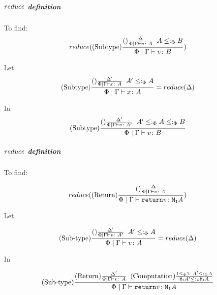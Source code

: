 {            
            \subparagraph{$reduce$ definition}
            To find:
            \begin{equation}
                reduce((\text{Subtype}) \frac{(\text{}) \frac{\Delta}{\Phi\mid\Gamma \vdash v \colon A}\;\; A \leq:_\Phi B}{\Phi\mid\Gamma \vdash v \colon B})
            \end{equation}

            Let 
            \begin{equation}\label{SubtypeDeltaReduction}
                (\text{Subtype}) \frac{(\text{}) \frac{\Delta'}{\Phi\mid\Gamma \vdash x \colon A}\;\; A'\leq:_\Phi A}{\Phi\mid\Gamma \vdash x \colon A} = reduce(\Delta)
            \end{equation}

            In 
            \begin{equation}
                (\text{Subtype}) \frac{
                    (\text{}) \frac{\Delta'}{\Phi\mid\Gamma \vdash v \colon A'}
                \;\;
                A' \leq:_\Phi A \leq:_\Phi B
                }{\Phi\mid\Gamma \vdash v \colon B}
            \end{equation}


            \subparagraph{$reduce$ definition}
            To find:
            
                \begin{equation}
                    reduce((\text{Return}) \frac{
                        (\text{}) \frac{\Delta}{\Phi\mid\Gamma \vdash v \colon A}
                    }{\Phi\mid\Gamma \vdash \texttt{return} v \colon \texttt{M}_{\texttt{1}}{A}})
                \end{equation}

                Let 

                \begin{equation}
                    (\text{Sub-type}) \frac{
                        (\text{}) \frac{\Delta'}{\Phi\mid\Gamma \vdash v \colon A'}
                        \;\;
                        A' \leq:_\Phi A
                    }{
                        \Phi\mid\Gamma \vdash v \colon A
                    } = reduce(\Delta)
                \end{equation}

                In

                \begin{equation}
                    (\text{Sub-type}) \frac{
                        (\text{Return}) \frac{
                            \Delta'
                        }{
                            \Phi\mid\Gamma \vdash v \colon A
                        }
                        \;\;
                        (\text{Computation}) \frac{         \texttt{1}\leq_{\Phi}\texttt{1}
                        \;\;
                        A'\leq:_\Phi A}{
                            \texttt{M}_{\texttt{1}}{A'}\leq:_\Phi\texttt{M}_{\texttt{1}}{A}
                        }
                    }{
                        \Phi\mid\Gamma \vdash \texttt{return} v \colon \texttt{M}_{\texttt{1}}{A}
                    }
                \end{equation}

}
